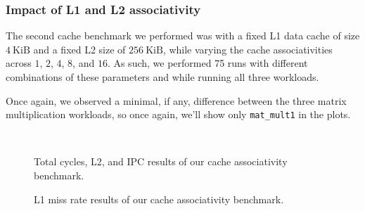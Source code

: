 \documentclass[10pt]{article}
\begin{document}
\subsubsection{Impact of L1 and L2 associativity}
The second cache benchmark we performed was with a fixed L1 data cache of size $4~\text{KiB}$ and a fixed L2 size of $256~\text{KiB}$, while varying the cache associativities across $1$, $2$, $4$, $8$, and $16$. As such, we performed 75 runs with different combinations of these parameters and while running all three workloads.

Once again, we observed a minimal, if any, difference between the three matrix multiplication workloads, so once again, we'll show only \texttt{mat\_mult1} in the plots.

\begin{figure}[htb!]
    \centering
    
    \hfill
    \\
    

    \caption{Total cycles, L2, and IPC results of our cache associativity benchmark.}
    \label{fig:task1:subtask2:main}
\end{figure}

\begin{figure}[htb!]
    \centering
    \hfill

    \caption{L1 miss rate results of our cache associativity benchmark.}
    \label{fig:task1:subtask2:l1}
\end{figure}
\end{document}
